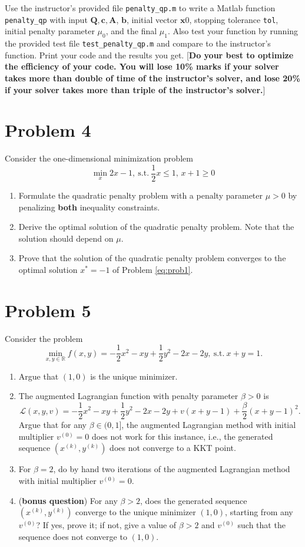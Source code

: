 \documentclass[12pt]{article}
\newcommand{\vb}{{\mathbf{b}}}
\newcommand{\vc}{{\mathbf{c}}}
\newcommand{\vx}{{\mathbf{x}}}
\newcommand{\vA}{{\mathbf{A}}}
\newcommand{\vQ}{{\mathbf{Q}}}
\newcommand{\cL}{{\mathcal{L}}}
\newcommand{\RR}{\mathbb{R}}
\newcommand{\st}{{\text{s.t.}}} %
\begin{document}
Use the instructor's provided file \verb|penalty_qp.m| to write a Matlab function \verb|penalty_qp| with input $\vQ, \vc, \vA$, $\vb$, initial vector $\vx0$, stopping tolerance \verb|tol|, initial penalty parameter $\mu_0$, and the final $\mu_1$. Also test your function by running the provided test file \verb|test_penalty_qp.m| and compare to the instructor's function. Print your code and the results you get. [\textbf{Do your best to optimize the efficiency of your code. You will lose 10\% marks if your solver takes more than double of time of the instructor's solver, and lose 20\% if your solver takes more than triple of the instructor's solver.}]

\newpage

\section*{Problem 4}
Consider the one-dimensional minimization problem
\begin{equation}\label{eq:prob1}
\min_x 2x - 1,\ \st \ \frac{1}{2}x\le 1,\, x+1 \ge 0
\end{equation}
\begin{enumerate}
\item Formulate the quadratic penalty problem with a penalty parameter $\mu > 0$ by penalizing \textbf{both} inequality constraints.
\item Derive the optimal solution of the quadratic penalty problem. Note that the solution should depend on $\mu$.
\item Prove that the solution of the quadratic penalty problem converges to the optimal solution $x^*=-1$ of Problem \eqref{eq:prob1}.
\end{enumerate}

\newpage

\section*{Problem 5}
Consider the problem
$$\min_{x,y\in\RR} f(x,y) = -\frac{1}{2}x^2-xy + \frac{1}{2}y^2-2x-2y,\ \st\ x+y=1.$$

\begin{enumerate}
\item Argue that $(1,0)$ is the unique minimizer.
\item The augmented Lagrangian function with penalty parameter $\beta>0$ is
$$\cL(x,y,v) = -\frac{1}{2}x^2-xy + \frac{1}{2}y^2-2x-2y + v(x+y-1)+ \frac{\beta}{2}(x+y-1)^2.$$
Argue that for any $\beta\in(0,1]$, the augmented Lagrangian method with initial multiplier $v^{(0)}=0$ does not work for this instance, i.e., the generated sequence $(x^{(k)},y^{(k)})$ does not converge to a KKT point.
\item For $\beta = 2$, do by hand two iterations of the augmented Lagrangian method with initial multiplier $v^{(0)}=0$.
\item (\textbf{bonus question}) For any $\beta>2$, does the generated sequence $(x^{(k)},y^{(k)})$ converge to the unique minimizer $(1,0)$, starting from any $v^{(0)}$? If yes, prove it; if not, give a value of $\beta>2$ and $v^{(0)}$ such that the sequence does not converge to $(1,0)$.
\end{enumerate}
\end{document}
